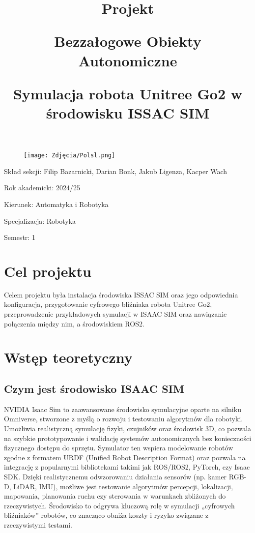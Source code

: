 \documentclass[12pt]{article}
\title{Projekt \par Bezzałogowe Obiekty Autonomiczne  \par \vspace{10pt} \textbf{Symulacja robota Unitree Go2 w środowisku ISSAC SIM}}
\date{}
\begin{document}
\begin{figure}[t]
\centering
    \texttt{[image: Zdjęcia/Polsl.png]}
\end{figure}

\maketitle
\vspace{150pt}
Skład sekcji: Filip Bazarnicki, Darian Bonk, Jakub Ligenza, Kacper Wach

Rok akademicki: 2024/25


Kierunek: Automatyka i Robotyka

Specjalizacja: Robotyka

Semestr: 1


\newpage

\section{Cel projektu}


Celem projektu była instalacja środowiska ISSAC SIM oraz jego odpowiednia konfiguracja, przygotowanie cyfrowego bliźniaka robota Unitree Go2, przeprowadzenie przykładowych symulacji w ISAAC SIM oraz nawiązanie połączenia między nim, a środowiskiem ROS2.

\section{Wstęp teoretyczny}
\subsection{Czym jest środowisko ISAAC SIM}

NVIDIA Isaac Sim to zaawansowane środowisko symulacyjne oparte na silniku Omniverse, stworzone z myślą o rozwoju i testowaniu algorytmów dla robotyki. Umożliwia realistyczną symulację fizyki, czujników oraz środowisk 3D, co pozwala na szybkie prototypowanie i walidację systemów autonomicznych bez konieczności fizycznego dostępu do sprzętu.
Symulator ten wspiera modelowanie robotów zgodne z formatem URDF (Unified Robot Description Format) oraz pozwala na integrację z popularnymi bibliotekami takimi jak ROS/ROS2, PyTorch, czy Isaac SDK. Dzięki realistycznemu odwzorowaniu działania sensorów (np. kamer RGB-D, LiDAR, IMU), możliwe jest testowanie algorytmów percepcji, lokalizacji, mapowania, planowania ruchu czy sterowania w warunkach zbliżonych do rzeczywistych.
Środowisko to odgrywa kluczową rolę w symulacji „cyfrowych bliźniaków” robotów, co znacząco obniża koszty i ryzyko związane z rzeczywistymi testami.
\end{document}
